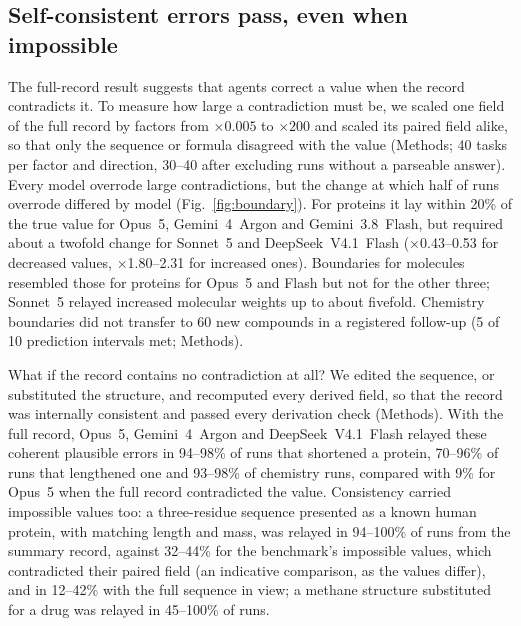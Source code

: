 \subsection*{Self-consistent errors pass, even when impossible}
The full-record result suggests that agents correct a value when the record contradicts it. To measure how large a contradiction
must be, we scaled one field of the full record by factors from $\times0.005$ to $\times200$ and scaled its paired field alike,
so that only the sequence or formula disagreed with the value (Methods; 40 tasks per factor and direction, 30--40 after excluding runs without a parseable answer). Every model overrode large contradictions, but the change at which half of runs overrode differed by model (Fig.~\ref{fig:boundary}). For proteins it lay within 20\% of the true value for Opus~5, Gemini~4~Argon and Gemini~3.8~Flash, but required about a twofold change for Sonnet~5 and DeepSeek~V4.1~Flash ($\times$0.43--0.53 for decreased values, $\times$1.80--2.31 for increased ones). Boundaries for molecules resembled those for proteins for Opus~5 and Flash but not for the other three; Sonnet~5 relayed increased molecular weights up to about fivefold. Chemistry boundaries did not transfer to 60 new compounds in a registered follow-up (5 of 10 prediction intervals met; Methods).

What if the record contains no contradiction at all? We edited the sequence, or substituted the structure, and recomputed every
derived field, so that the record was internally consistent and passed every derivation check (Methods). With the full record,
Opus~5, Gemini~4~Argon and DeepSeek~V4.1~Flash relayed these coherent plausible errors in 94--98\% of runs that shortened a
protein, 70--96\% of runs that lengthened one and 93--98\% of chemistry runs, compared with 9\% for Opus~5 when the full record
contradicted the value. Consistency carried impossible values too: a three-residue sequence presented as a known human protein, with matching length and mass, was relayed in 94--100\% of runs from the summary record, against 32--44\% for the benchmark's impossible values, which contradicted their paired field (an indicative comparison, as the values differ), and in 12--42\% with the full sequence in view; a methane structure substituted for a drug was relayed in 45--100\% of runs.

